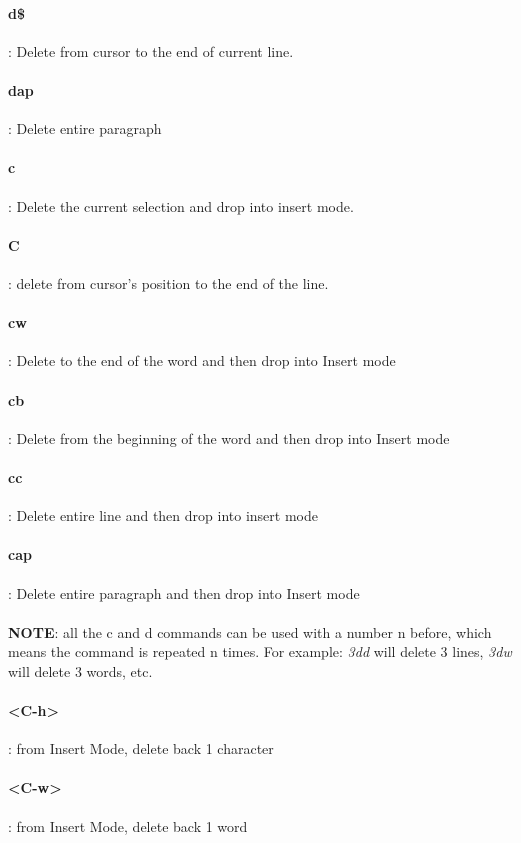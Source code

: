 \documentclass[10pt,letterpaper]{book}
\begin{document}
\paragraph{d\$}: Delete from cursor to the end of current line.

\paragraph{dap}: Delete entire paragraph
\paragraph{c}: Delete the current selection and drop into insert mode.
\paragraph{C}: delete from cursor's position to the end of the line.

\paragraph{cw}: Delete to the end of the word and then drop into Insert mode
\paragraph{cb}: Delete from the beginning of the word and then drop into Insert mode
\paragraph{cc}: Delete entire line and then drop into insert mode
\paragraph{cap}: Delete entire paragraph and then drop into Insert mode
\\ \\
\textbf{NOTE}: all the c and d commands can be used with a number n before, which means the command is repeated n times. For example: \textit{3dd} will delete 3 lines, \textit{3dw} will delete 3 words, etc.
\paragraph{<C-h>}: from Insert Mode, delete back 1 character
\paragraph{<C-w>}: from Insert Mode, delete back 1 word
\end{document}
